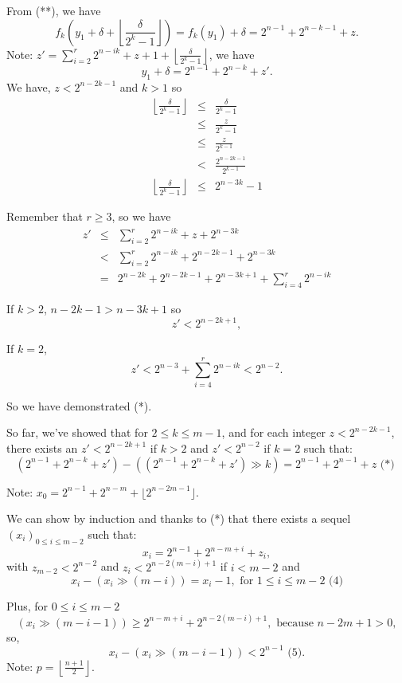 \documentclass[a4paper,12pt]{article}
\begin{document}
\begin{itemize}
\begin{description}
From (**), we have
\[f_k\left(y_1 + \delta + \left\lfloor\frac{\delta}{2^k-1}\right\rfloor\right)
= f_k(y_1) + \delta = 2^{n-1} + 2^{n-k-1} + z.\]
Note: $z' = \sum_{i=2}^r 2^{n-ik} + z + 1 + \left\lfloor\frac{\delta}{2^k-1}
\right\rfloor$, we have
\[ y_1 + \delta = 2^{n-1} + 2^{n-k} + z'.\]
We have, $z < 2^{n-2k-1}$ and $k > 1$ so
\begin{eqnarray*}
\left\lfloor\frac{\delta}{2^k-1}\right\rfloor & \le &
\frac{\delta}{2^k-1}\\ & \le &
\frac{z}{2^k-1}\\ & \le &
\frac{z}{2^{k-1}} \\ & < &
\frac{2^{n-2k-1}}{2^{k-1}} \\
\left\lfloor\frac{\delta}{2^k-1}\right\rfloor & \le & 2^{n-3k}-1 
\end{eqnarray*}

Remember that $r \ge 3$, so we have
\begin{eqnarray*}
z' & \le & \sum_{i=2}^r2^{n-ik} + z + 2^{n-3k}\\
& < & \sum_{i=2}^r 2^{n-ik} + 2^{n-2k-1} + 2^{n-3k} \\
& = & 2^{n-2k} + 2^{n-2k-1} + 2^{n-3k+1} + \sum_{i=4}^r 2^{n-ik}
\end{eqnarray*}

If $k > 2$, $n-2k-1 > n-3k+1$ so
\[z' < 2^{n-2k+1},\]

If $k = 2$,
\[z' < 2^{n-3} + \sum_{i=4}^r 2^{n-ik} < 2^{n-2}.\]

So we have demonstrated (*).
\end{description}
\end{itemize}

So far, we've showed that for $2 \le k \le m-1$, and for each integer
$z < 2^{n-2k-1}$, there exists an $z' < 2^{n-2k+1}$ if $k > 2$ and
$z' < 2^{n-2}$ if $k = 2$ such that:
\[(2^{n-1} + 2^{n-k} + z') - ((2^{n-1} + 2^{n-k} + z') \gg k) =
2^{n-1} + 2^{n-1} + z \mbox{ (*) }\]

Note: $x_0 = 2^{n-1} + 2^{n-m} + \lfloor 2^{n-2m-1}\rfloor$.

We can show by induction and thanks to (*) that there exists a sequel
$(x_i)_{0 \le i \le m-2}$ such that:
\[x_i = 2^{n-1} + 2^{n-m+i} + z_i,\]
with $z_{m-2}< 2^{n-2}$ and $z_i < 2^{n-2(m-i)+1}$ if $i < m-2$ and
\[x_i - (x_i \gg (m-i)) = x_i-1, \mbox{ for } 1 \le i \le m-2 \mbox{ (4)}\]

Plus, for $0 \le i \le m-2$
\[(x_i \gg (m-i-1)) \ge 2^{n-m+i} + 2^{n-2(m-i)+1}, \mbox{ because } n-2m+1 > 0,\]
so,
\[x_i - (x_i \gg (m-i-1)) < 2^{n-1} \mbox { (5).}\]
Note: $p = \left\lfloor\frac{n+1}{2}\right\rfloor$.
\end{document}
